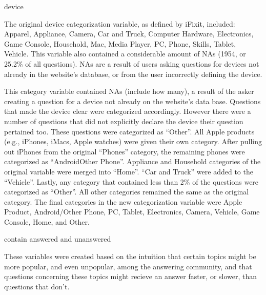 \documentclass{article}
\begin{document}
device

The original device categorization variable, as defined by iFixit, included: Apparel, Appliance, Camera, Car and Truck, Computer Hardware, Electronics, Game Console, Household, Mac, Media Player, PC, Phone, Skills, Tablet, Vehicle. This variable also contained a considerable amount of NAs (1954, or 25.2\% of all questions). NAs are a result of users asking questions for devices not already in the website's database, or from the user incorrectly defining the device. 


This category variable contained NAs (include how many), a result of the asker creating a question for a device not already on the website's data base. Questions that made the device clear were categorized accordingly. However there were a number of questions that did not explicitly declare the device their question pertained too. These questions were categorized as ``Other''. All Apple products (e.g., iPhones, iMacs, Apple watches) were given their own category. After pulling out iPhones from the original ``Phones'' category, the remaining phones were categorized as ``AndroidOther Phone''. Appliance and Household categories of the original variable were merged into ``Home''. ``Car and Truck'' were added to the ``Vehicle''. Lastly, any category that contained less than 2\% of the questions were categorized as ``Other''. All other categories remained the same as the original category. The final categories in the new categorization variable were Apple Product, Android/Other Phone, PC, Tablet, Electronics, Camera, Vehicle, Game Console, Home, and Other. 

contain answered and unanswered

  These variables were created based on the intuition that certain topics might be more popular, and even unpopular, among the answering community, and that questions concerning these topics might recieve an answer faster, or slower, than questions that don't. 
  
\end{document}

